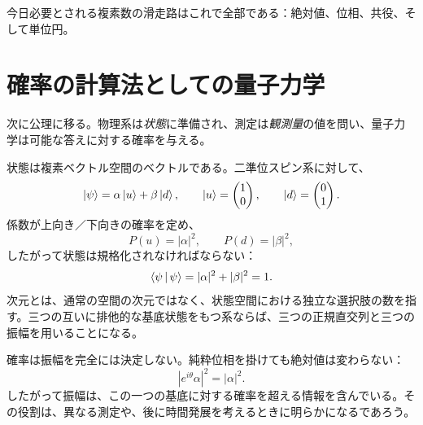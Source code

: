 \begin{classroomqa}
\end{classroomqa}

今日必要とされる複素数の滑走路はこれで全部である：絶対値、位相、共役、そして単位円。

\section{確率の計算法としての量子力学}

次に公理に移る。物理系は\emph{状態}に準備され、測定は\emph{観測量}の値を問い、量子力学は可能な答えに対する確率を与える。

状態は複素ベクトル空間のベクトルである。二準位スピン系に対して、
\begin{equation}
  \left\lvert\psi\right\rangle=\alpha\left\lvert u\right\rangle+\beta\left\lvert d\right\rangle,
  \qquad
  \left\lvert u\right\rangle=\begin{pmatrix}1\\0\end{pmatrix},
  \qquad
  \left\lvert d\right\rangle=\begin{pmatrix}0\\1\end{pmatrix}.
  \label{eq:l03-two-level-state}
\end{equation}
係数が上向き／下向きの確率を定め、
\begin{equation}
  P(u)=|\alpha|^2,
  \qquad
  P(d)=|\beta|^2,
\end{equation}
したがって状態は規格化されなければならない：
\begin{equation}
  \left\langle\psi\,\middle|\,\psi\right\rangle
  =|\alpha|^2+|\beta|^2
  =1.
  \label{eq:l03-state-normalization}
\end{equation}
次元とは、通常の空間の次元ではなく、状態空間における独立な選択肢の数を指す。三つの互いに排他的な基底状態をもつ系ならば、三つの正規直交列と三つの振幅を用いることになる。

確率は振幅を完全には決定しない。純粋位相を掛けても絶対値は変わらない：
\begin{equation}
  |e^{i\theta}\alpha|^2=|\alpha|^2.
\end{equation}
したがって振幅は、この一つの基底に対する確率を超える情報を含んでいる。その役割は、異なる測定や、後に時間発展を考えるときに明らかになるであろう。

